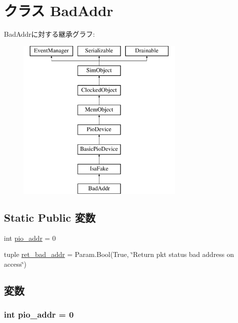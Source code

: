 \hypertarget{classDevice_1_1BadAddr}{
\section{クラス BadAddr}
\label{classDevice_1_1BadAddr}
}
BadAddrに対する継承グラフ:\begin{figure}[H]
\begin{center}
\leavevmode
\includegraphics[height=8cm]{classDevice_1_1BadAddr}
\end{center}
\end{figure}
\subsection*{Static Public 変数}
\begin{DoxyCompactItemize}
\item 
int \hyperlink{classDevice_1_1BadAddr_a659450bdbf05cdba8edf24c47df67671}{pio\_\-addr} = 0
\item 
tuple \hyperlink{classDevice_1_1BadAddr_afe050af66b0ed365423418f0163f2e10}{ret\_\-bad\_\-addr} = Param.Bool(True, \char`\"{}Return pkt status bad address on access\char`\"{})
\end{DoxyCompactItemize}


\subsection{変数}
\hypertarget{classDevice_1_1BadAddr_a659450bdbf05cdba8edf24c47df67671}{
\subsubsection[{pio\_\-addr}]{\setlength{\rightskip}{0pt plus 5cm}int {\bf pio\_\-addr} = 0}}
\label{classDevice_1_1BadAddr_a659450bdbf05cdba8edf24c47df67671}


